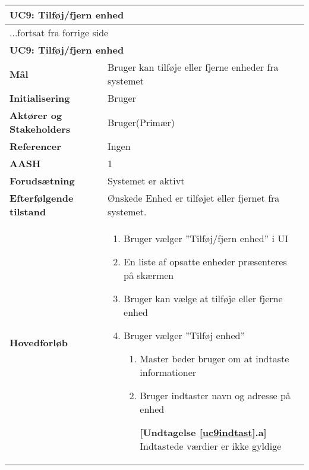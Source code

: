 \begin{center} \centering \label{UC9}
	\begin{longtable}{|p{5cm}|p{9cm}|}  %
	\hline
		\multicolumn{2}{|l|}{\textbf{UC9: Tilføj\slash fjern enhed}} \\\hline %
		\endfirsthead
		
		\multicolumn{2}{l}{...fortsat fra forrige side} \\ \hline %
		\multicolumn{2}{|l|}{\textbf{UC9: Tilføj\slash fjern enhed}} \\\hline %
		\endhead	
		
		\textbf{Mål}								&Bruger kan tilføje eller fjerne enheder fra systemet			\\\hline
		\textbf{Initialisering}					&Bruger														\\\hline
		\textbf{Aktører og Stakeholders}			&Bruger(Primær)												\\\hline
		\textbf{Referencer}						&Ingen														\\\hline
		\textbf{AASH}							&1															\\\hline
		\textbf{Forudsætning}					&Systemet er aktivt											\\\hline
		\textbf{Efterfølgende tilstand}			&Ønskede Enhed er tilføjet eller fjernet fra systemet.		\\\hline
		\textbf{Hovedforløb}					
			&\begin{enumerate}
	
				\item Bruger vælger ''Tilføj/fjern enhed'' i UI
				
				\item En liste af opsatte enheder præsenteres på skærmen
				
				\item \label{uc9valg} Bruger kan vælge at tilføje eller fjerne enhed
				
				\item Bruger vælger ''Tilføj enhed''
				
				\begin{enumerate}
					\item \label{uc9indtast} Master beder bruger om at indtaste informationer
					
					\item \label{uc9indtast_fejl} Bruger indtaster navn og adresse på enhed
					
						\textbf{[Undtagelse \ref{uc9indtast}.a]} \newline
						Indtastede værdier er ikke gyldige
					

\end{enumerate}
\end{enumerate}
\end{longtable}
\end{center}
